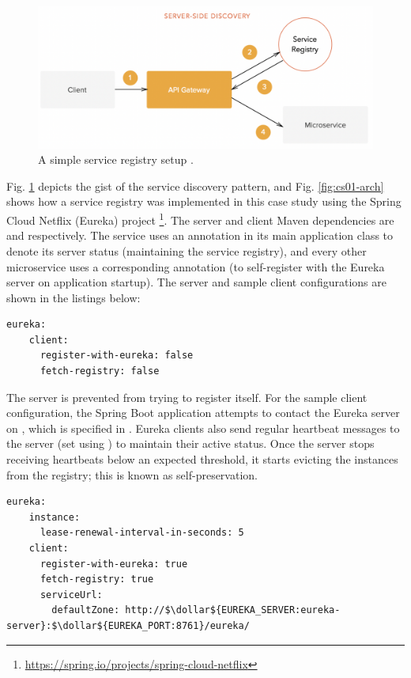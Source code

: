 \begin{figure}[H]
  \centering
  \includegraphics[width=0.7\linewidth]{./assets/images/case-studies/server-side-discovery.png}
  \caption{A simple service registry setup \cite{peyrott15}.}
  \label{fig:server-side-discovery}
\end{figure}

Fig. \ref{fig:server-side-discovery} depicts the gist of the service discovery pattern, and Fig. \ref{fig:cs01-arch} shows how a service registry was implemented in this case study using the Spring Cloud Netflix (Eureka) project \footnote{\url{https://spring.io/projects/spring-cloud-netflix}}. The server and client Maven dependencies are  and  respectively. The  service uses an  annotation in its main application class to denote its server status (maintaining the service registry), and every other microservice uses a corresponding  annotation (to self-register with the Eureka server on application startup). The server and sample client configurations are shown in the listings below:

\begin{lstlisting}[caption=Snippet from Eureka server's application properties.]
  eureka:
    client:
      register-with-eureka: false
      fetch-registry: false
\end{lstlisting}

The server is prevented from trying to register itself. For the sample client configuration, the Spring Boot application attempts to contact the Eureka server on , which is specified in . Eureka clients also send regular heartbeat messages to the server (set using ) to maintain their active status. Once the server stops receiving heartbeats below an expected threshold, it starts evicting the instances from the registry; this is known as self-preservation.

\begin{lstlisting}[caption=Snippet from a Eureka client's application properties.]
  eureka:
    instance:
      lease-renewal-interval-in-seconds: 5
    client:
      register-with-eureka: true
      fetch-registry: true
      serviceUrl:
        defaultZone: http://$\dollar${EUREKA_SERVER:eureka-server}:$\dollar${EUREKA_PORT:8761}/eureka/
\end{lstlisting}

